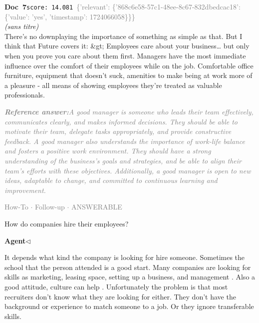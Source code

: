 \documentclass[a4paper,11pt]{article}
\begin{document}
\begin{docenv}
{\footnotesize\textcolor{doccolor}{\textbf{Doc~7}}}\hfill{\tiny\texttt{score:~14.081}}\ {\tiny\textcolor{gray}{\{'relevant': \{'868c6e58-57c1-48ee-8c67-832dbedcac18': \{'value': 'yes', 'timestamp': 1724066058\}\}\}}}\\[3pt]
{\small\textit{(sans titre)}}\\[2pt]
\vspace{2pt}
{\footnotesize 
There's no downplaying the importance of something as simple as that.  But I think that Future covers it:  \&gt; Employees care about your business… but only when you prove you care about them first.  Managers have the most immediate influence over the comfort of their employees while on the job. Comfortable office furniture, equipment that doesn't suck, amenities to make being at work more of a pleasure - all means of showing employees they're treated as valuable professionals.}
\end{docenv}
\begin{refanswerenv}
{\footnotesize\textit{\textcolor{gray}{\textbf{Reference answer:}\enspace A good manager is someone who leads their team effectively, communicates clearly, and makes informed decisions. They should be able to motivate their team, delegate tasks appropriately, and provide constructive feedback. A good manager also understands the importance of work-life balance and fosters a positive work environment. They should have a strong understanding of the business's goals and strategies, and be able to align their team's efforts with these objectives. Additionally, a good manager is open to new ideas, adaptable to change, and committed to continuous learning and improvement.}}}
\end{refanswerenv}
\vspace{0.5em}
\hfill{\tiny\textcolor{gray}{How-To $\cdot$ Follow-up $\cdot$ ANSWERABLE}}
\begin{userbubble}
How do companies hire their employees?
\end{userbubble}
\noindent\hfill{\small\textcolor{agentcolor}{\textbf{Agent\enspace$\triangleleft$}}}
\begin{agentbubble}
   It depends what kind the company  is looking for hire someone. Sometimes the school that the person attended is a good start. Many companies are looking for skills as marketing, leasing space, setting up a business, and management . Also a good attitude, culture can help . Unfortunately the problem is that most recruiters don't know what they are looking for either. They don't have the background or experience to match someone to a job. Or they ignore transferable skills. 
\end{agentbubble}
\end{document}

